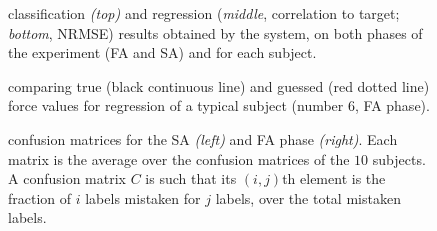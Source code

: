 \documentclass[10pt]{bmc_article}
\def\texttt{[image: ]}
\newenvironment{bmcformat}
  {\begin{raggedright}\baselineskip20pt\sloppy\setboolean{publ}{false}}
  {\end{raggedright}\baselineskip20pt\sloppy}
\begin{document}
\begin{bmcformat}

\begin{figure}[!ht] \centering
  \caption{classification \emph{(top)} and regression (\emph{middle}, correlation to target;
    \emph{bottom}, NRMSE) results obtained by the system, on both phases of the
    experiment (FA and SA) and for each subject.}
  \label{fig:results}
\end{figure}

\begin{figure}[!ht] \centering
  \caption{comparing true (black continuous line) and guessed (red dotted line)
    force values for regression of a typical subject (number $6$, FA phase).}
  \label{fig:examples}
\end{figure}

\begin{figure*}[!ht] \centering
  \caption{confusion matrices for the SA \emph{(left)} and FA phase \emph{(right)}. Each matrix
           is the average over the confusion matrices of the $10$ subjects. A confusion
           matrix $C$ is such that its $(i,j)$th element is the fraction of $i$ labels
           mistaken for $j$ labels, over the total mistaken labels.}
  \label{fig:confusion}
\end{figure*}


\end{bmcformat}
\end{document}
